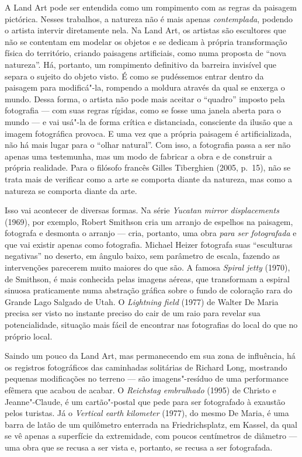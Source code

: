 A Land Art pode ser entendida como um rompimento com as regras da
paisagem pictórica. Nesses trabalhos, a natureza não é mais apenas
\emph{contemplada}, podendo o artista intervir diretamente nela. Na Land
Art, os artistas são escultores que não se contentam em modelar os
objetos e se dedicam à própria transformação física do território,
criando paisagens artificiais, como numa proposta de ``nova natureza''.
Há, portanto, um rompimento definitivo da barreira invisível que separa
o sujeito do objeto visto. É como se pudéssemos entrar dentro da
paisagem para modificá"-la, rompendo a moldura através da qual se enxerga
o mundo. Dessa forma, o artista não pode mais aceitar o ``quadro''
imposto pela fotografia --- com suas regras rígidas, como se fosse uma
janela aberta para o mundo --- e vai usá"-la de forma crítica e
distanciada, consciente da ilusão que a imagem fotográfica provoca. E
uma vez que a própria paisagem é artificializada, não há mais lugar para
o ``olhar natural''. Com isso, a fotografia passa a ser não apenas uma
testemunha, mas um modo de fabricar a obra e de construir a própria
realidade. Para o filósofo francês Gilles Tiberghien (2005, p.~15), não
se trata mais de verificar como a arte se comporta diante da natureza,
mas como a natureza se comporta diante da arte.

Isso vai acontecer de diversas formas. Na série \emph{Yucatan mirror
displacements} (1969), por exemplo, Robert Smithson cria um arranjo de
espelhos na paisagem, fotografa e desmonta o arranjo --- cria, portanto,
uma obra \emph{para ser fotografada} e que vai existir apenas como
fotografia. Michael Heizer fotografa suas ``esculturas negativas'' no
deserto, em ângulo baixo, sem parâmetro de escala, fazendo as
intervenções parecerem muito maiores do que são. A famosa \emph{Spiral
jetty} (1970), de Smithson, é mais conhecida pelas imagens aéreas, que
transformam a espiral sinuosa praticamente numa abstração gráfica sobre
o fundo de coloração rara do Grande Lago Salgado de Utah. O
\emph{Lightning field} (1977) de Walter De Maria precisa ser visto no
instante preciso do cair de um raio para revelar sua potencialidade,
situação mais fácil de encontrar nas fotografias do local do que no
próprio local.

Saindo um pouco da Land Art, mas permanecendo em sua zona de influência,
há os registros fotográficos das caminhadas solitárias de Richard Long,
mostrando pequenas modificações no terreno --- são imagens"-resíduo de uma
performance efêmera que acabou de acabar. O \emph{Reichstag embrulhado}
(1995) de Christo e Jeanne"-Claude, é um cartão"-postal que pede para ser
fotografado à exaustão pelos turistas. Já o \emph{Vertical earth
kilometer} (1977), do mesmo De Maria, é uma barra de latão de um
quilômetro enterrada na Friedrichsplatz, em Kassel, da qual se vê apenas
a superfície da extremidade, com poucos centímetros de diâmetro --- uma
obra que se recusa a ser vista e, portanto, se recusa a ser fotografada.

